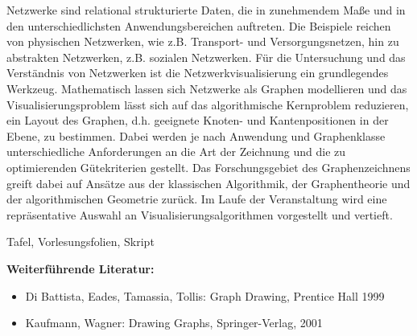 \begin{course}
\begin{content}
Netzwerke sind relational strukturierte Daten, die in zunehmendem Maße und in den unterschiedlichsten Anwendungsbereichen auftreten. Die Beispiele reichen von physischen Netzwerken, wie z.B. Transport- und Versorgungsnetzen, hin zu abstrakten Netzwerken, z.B. sozialen Netzwerken. Für die Untersuchung und das Verständnis von Netzwerken ist die Netzwerkvisualisierung ein grundlegendes Werkzeug.\newline
\newline
Mathematisch lassen sich Netzwerke als Graphen modellieren und das Visualisierungsproblem lässt sich auf das algorithmische Kernproblem reduzieren, ein Layout des Graphen, d.h. geeignete Knoten- und Kantenpositionen in der Ebene, zu bestimmen. Dabei werden je nach Anwendung und Graphenklasse unterschiedliche Anforderungen an die Art der Zeichnung und die zu optimierenden Gütekriterien gestellt. Das Forschungsgebiet des Graphenzeichnens greift dabei auf Ansätze aus der klassischen Algorithmik, der Graphentheorie und der algorithmischen Geometrie zurück. \newline
\newline
Im Laufe der Veranstaltung wird eine repräsentative Auswahl an Visualisierungsalgorithmen vorgestellt und vertieft.


\end{content}

\begin{media}Tafel, Vorlesungsfolien, Skript

\end{media}

\begin{literature}\textbf{Weiterführende Literatur:}

 \begin{itemize}\item Di Battista, Eades, Tamassia, Tollis: Graph Drawing, Prentice Hall 1999  \item Kaufmann, Wagner: Drawing Graphs, Springer-Verlag, 2001  \end{itemize}\end{literature}



\end{course}